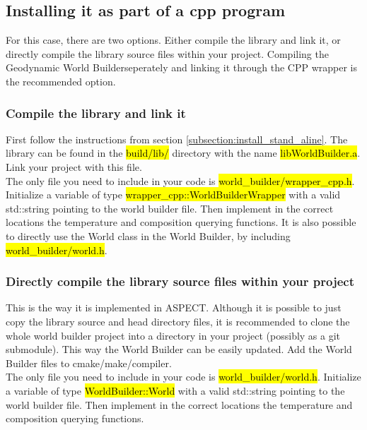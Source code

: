 \documentclass{book}
\newcommand{\GWB}{{Geodynamic World Builder}}
\newcommand{\WB}{{World Builder}}
\newcommand{\aspect}{{ASPECT}}
\begin{document}
\subsection{Installing it as part of a cpp program}
For this case, there are two options. Either compile the library and link it, or directly compile the library source files within your project. Compiling the \GWB seperately and linking it through the CPP wrapper is the recommended option.

\subsubsection{Compile the library and link it}
First follow the instructions from section \ref{subsection:install_stand_aline}. The library can be found in the \hl{build/lib/} directory with the name \hl{libWorldBuilder.a}. Link your project with this file. 
\\
The only file you need to include in your code is \hl{world\_builder/wrapper\_cpp.h}. Initialize a variable of type \hl{wrapper\_cpp::WorldBuilderWrapper} with a valid std::string pointing to the world builder file. Then implement in the correct locations the temperature and composition querying functions. It is also possible to directly use the World class in the World Builder, by including \hl{world\_builder/world.h}.

\subsubsection{Directly compile the library source files within your project}
\label{subsubsection:direct_compile_library_source}
This is the way it is implemented in \aspect{}. Although it is possible to just copy the library source and head directory files, it is recommended to clone the whole world builder project into a directory in your project (possibly as a git submodule). This way the \WB{} can be easily updated. Add the \WB{} files to cmake/make/compiler. 
\\
The only file you need to include in your code is \hl{world\_builder/world.h}. Initialize a variable of type \hl{WorldBuilder::World} with a valid std::string pointing to the world builder file. Then implement in the correct locations the temperature and composition querying functions.
\end{document}
